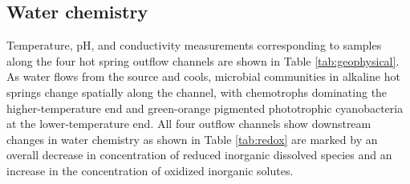 

\subsection{Water chemistry}
Temperature, pH, and conductivity measurements corresponding to samples along the four hot spring outflow channels are shown in Table \ref{tab:geophysical}. As water flows from the source and cools, microbial communities in alkaline hot springs change spatially along the channel, with chemotrophs dominating the higher-temperature end and green-orange pigmented phototrophic cyanobacteria at the lower-temperature end. All four outflow channels show downstream changes in water chemistry as shown in Table \ref{tab:redox} are marked by an overall decrease in concentration of reduced inorganic dissolved species and an increase in the concentration of oxidized inorganic solutes.


